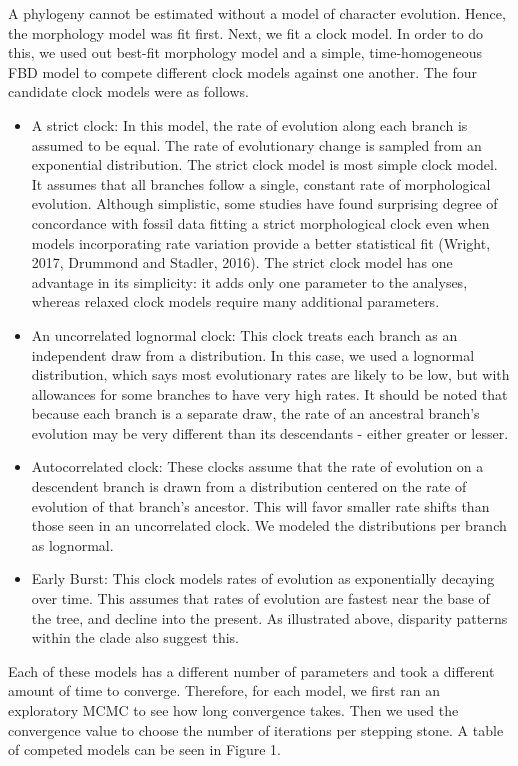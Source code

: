 \documentclass{article}
\begin{document}
A phylogeny cannot be estimated without a model of character evolution. 
Hence, the morphology model was fit first.
Next, we fit a clock model. 
In order to do this, we used out best-fit morphology model and a simple, time-homogeneous FBD model to compete different clock models against one another.
The four candidate clock models were as follows.
\begin{itemize}
    \item A strict clock: In this model, the rate of evolution along each branch is assumed to be equal. The rate of evolutionary change is sampled from an exponential distribution. 
    The strict clock model is most simple clock model. 
    It assumes that all branches follow a single, constant rate of morphological evolution. 
    Although simplistic, some studies have found surprising degree of concordance with fossil data fitting a strict morphological clock even when models incorporating rate variation provide a better statistical fit (Wright, 2017, Drummond and Stadler, 2016). 
    The strict clock model has one advantage in its simplicity: it adds only one parameter to the analyses, whereas relaxed clock models require many additional parameters.
    \item An uncorrelated lognormal clock: This clock treats each branch as an independent draw from a distribution.  
    In this case, we used a lognormal distribution, which says most evolutionary rates are likely to be low, but with allowances for some branches to have very high rates. 
    It should be noted that because each branch is a separate draw, the rate of an ancestral branch's evolution may be very different than its descendants - either greater or lesser.
    \item Autocorrelated clock: These clocks assume that the rate of evolution on a descendent branch is drawn from a distribution centered on the rate of evolution of that branch's ancestor. 
    This will favor smaller rate shifts than those seen in an uncorrelated clock. We modeled the distributions per branch as lognormal.
    \item Early Burst: This clock models rates of evolution as exponentially decaying over time. 
    This assumes that rates of evolution are fastest near the base of the tree, and decline into the present. As illustrated above, disparity patterns within the clade also suggest this.
\end{itemize}

Each of these models has a different number of parameters and took a different amount of time to converge. Therefore, for each model, we first ran an exploratory MCMC to see how long convergence takes. Then we used the convergence value to choose the number of iterations per stepping stone.
A table of competed models can be seen in Figure 1.
\end{document}
